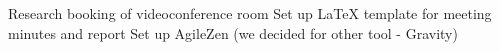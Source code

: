 \nextItem Research booking of videoconference room 
\nextItem Set up LaTeX template for meeting minutes and report 
\nextItem Set up AgileZen (we decided for other tool - Gravity)
